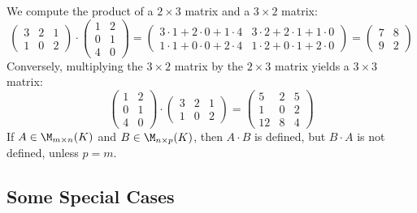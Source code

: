 \begin{example}
We compute the product of a $2 \times 3$ matrix and a $3 \times 2$ matrix:
\begin{equation*}
    \begin{pmatrix} 3 & 2 & 1 \\ 1 & 0 & 2 \end{pmatrix} \cdot \begin{pmatrix} 1 & 2 \\ 0 & 1 \\ 4 & 0 \end{pmatrix} = \begin{pmatrix} 3 \cdot 1 + 2 \cdot 0 + 1 \cdot 4 & 3 \cdot 2 + 2 \cdot 1 + 1 \cdot 0 \\ 1 \cdot 1 + 0 \cdot 0 + 2 \cdot 4 & 1 \cdot 2 + 0 \cdot 1 + 2 \cdot 0 \end{pmatrix} = \begin{pmatrix} 7 & 8 \\ 9 & 2 \end{pmatrix}
\end{equation*}
Conversely, multiplying the $3 \times 2$ matrix by the $2 \times 3$ matrix yields a $3 \times 3$ matrix:
\begin{equation*}
    \begin{pmatrix} 1 & 2 \\ 0 & 1 \\ 4 & 0 \end{pmatrix} \cdot \begin{pmatrix} 3 & 2 & 1 \\ 1 & 0 & 2 \end{pmatrix} = \begin{pmatrix} 5 & 2 & 5 \\ 1 & 0 & 2 \\ 12 & 8 & 4 \end{pmatrix}
\end{equation*}
If $A \in \M_{m \times n}(K)$ and $B \in \M_{n \times p}(K)$, then $A \cdot B$ is defined, but $B \cdot A$ is not defined, unless $p = m$.
\end{example}

\subsection{Some Special Cases}

